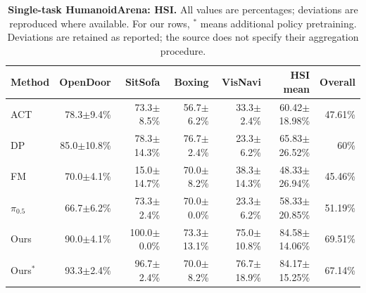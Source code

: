\begin{table}[t]
\centering\small
\caption{\textbf{Single-task HumanoidArena: HSI.} All values are percentages; deviations are reproduced where available. For our rows, $^{*}$ means additional policy pretraining. Deviations are retained as reported; the source does not specify their aggregation procedure.}
\label{tab:supp_single_hsi}
\setlength{\tabcolsep}{4pt}
\begin{tabular}{lrrrrrr}\toprule
Method & OpenDoor & SitSofa & Boxing & VisNavi & HSI mean & Overall\\\midrule
ACT & 78.3$\pm$9.4\% & 73.3$\pm$8.5\% & 56.7$\pm$6.2\% & 33.3$\pm$2.4\% & 60.42$\pm$18.98\% & 47.61\%\\
DP & 85.0$\pm$10.8\% & 78.3$\pm$14.3\% & 76.7$\pm$2.4\% & 23.3$\pm$6.2\% & 65.83$\pm$26.52\% & 60\%\\
FM & 70.0$\pm$4.1\% & 15.0$\pm$14.7\% & 70.0$\pm$8.2\% & 38.3$\pm$14.3\% & 48.33$\pm$26.94\% & 45.46\%\\
$\pi_{0.5}$ & 66.7$\pm$6.2\% & 73.3$\pm$2.4\% & 70.0$\pm$0.0\% & 23.3$\pm$6.2\% & 58.33$\pm$20.85\% & 51.19\%\\
Ours & 90.0$\pm$4.1\% & 100.0$\pm$0.0\% & 73.3$\pm$13.1\% & 75.0$\pm$10.8\% & 84.58$\pm$14.06\% & 69.51\%\\
Ours$^{*}$ & 93.3$\pm$2.4\% & 96.7$\pm$2.4\% & 70.0$\pm$8.2\% & 76.7$\pm$18.9\% & 84.17$\pm$15.25\% & 67.14\%\\
\bottomrule\end{tabular}\end{table}
